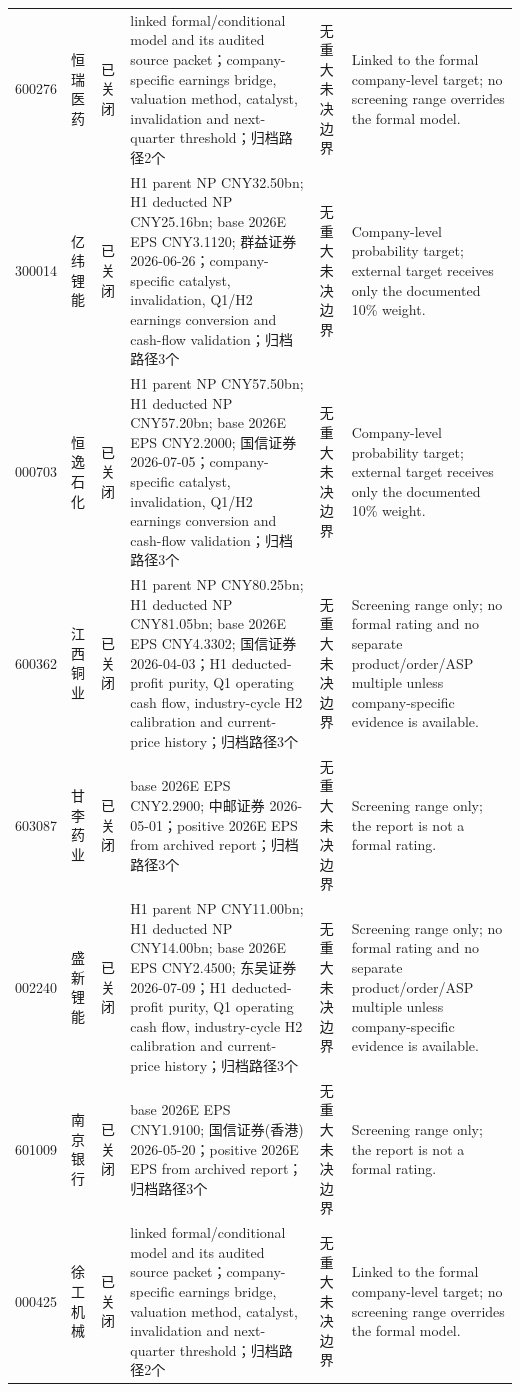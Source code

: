 \begin{longtable}{L{1.00cm}L{1.40cm}L{1.45cm}L{2.85cm}L{2.50cm}L{3.05cm}}
600276 & 恒瑞医药 & 已关闭 & linked formal/conditional model and its audited source packet；company-specific earnings bridge, valuation method, catalyst, invalidation and next-quarter threshold；归档路径2个 & 无重大未决边界 & Linked to the formal company-level target; no screening range overrides the formal model. \\
300014 & 亿纬锂能 & 已关闭 & H1 parent NP CNY32.50bn; H1 deducted NP CNY25.16bn; base 2026E EPS CNY3.1120; 群益证券 2026-06-26；company-specific catalyst, invalidation, Q1/H2 earnings conversion and cash-flow validation；归档路径3个 & 无重大未决边界 & Company-level probability target; external target receives only the documented 10\% weight. \\
000703 & 恒逸石化 & 已关闭 & H1 parent NP CNY57.50bn; H1 deducted NP CNY57.20bn; base 2026E EPS CNY2.2000; 国信证券 2026-07-05；company-specific catalyst, invalidation, Q1/H2 earnings conversion and cash-flow validation；归档路径3个 & 无重大未决边界 & Company-level probability target; external target receives only the documented 10\% weight. \\
600362 & 江西铜业 & 已关闭 & H1 parent NP CNY80.25bn; H1 deducted NP CNY81.05bn; base 2026E EPS CNY4.3302; 国信证券 2026-04-03；H1 deducted-profit purity, Q1 operating cash flow, industry-cycle H2 calibration and current-price history；归档路径3个 & 无重大未决边界 & Screening range only; no formal rating and no separate product/order/ASP multiple unless company-specific evidence is available. \\
603087 & 甘李药业 & 已关闭 & base 2026E EPS CNY2.2900; 中邮证券 2026-05-01；positive 2026E EPS from archived report；归档路径3个 & 无重大未决边界 & Screening range only; the report is not a formal rating. \\
002240 & 盛新锂能 & 已关闭 & H1 parent NP CNY11.00bn; H1 deducted NP CNY14.00bn; base 2026E EPS CNY2.4500; 东吴证券 2026-07-09；H1 deducted-profit purity, Q1 operating cash flow, industry-cycle H2 calibration and current-price history；归档路径3个 & 无重大未决边界 & Screening range only; no formal rating and no separate product/order/ASP multiple unless company-specific evidence is available. \\
601009 & 南京银行 & 已关闭 & base 2026E EPS CNY1.9100; 国信证券(香港) 2026-05-20；positive 2026E EPS from archived report；归档路径3个 & 无重大未决边界 & Screening range only; the report is not a formal rating. \\
000425 & 徐工机械 & 已关闭 & linked formal/conditional model and its audited source packet；company-specific earnings bridge, valuation method, catalyst, invalidation and next-quarter threshold；归档路径2个 & 无重大未决边界 & Linked to the formal company-level target; no screening range overrides the formal model. \\

\end{longtable}
